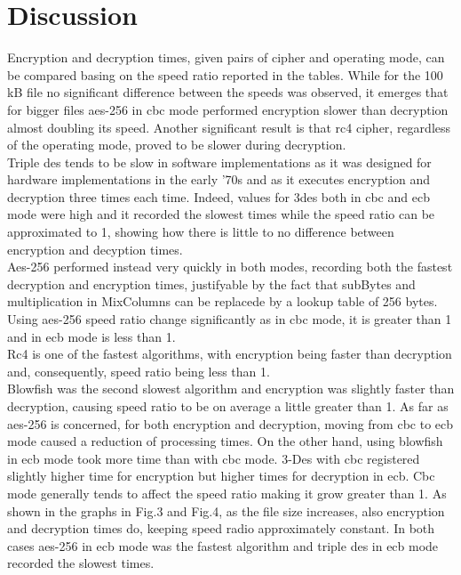 \documentclass{article}
\begin{document}
\section{Discussion}
Encryption and decryption times, given pairs of cipher and operating mode, can be compared basing on the speed ratio reported in the tables. While for the 100 kB file no significant difference between the speeds was observed, it emerges that for bigger files aes-256 in cbc mode performed encryption slower than decryption almost doubling its speed. Another significant result is that rc4 cipher, regardless of the operating mode, proved to be slower during decryption. \\
Triple des tends to be slow in software implementations as it was designed for hardware implementations in the early '70s and as it executes encryption and decryption three times each time. Indeed, values for 3des both in cbc and ecb mode were high and it recorded the slowest times while the speed ratio can be approximated to 1, showing how there is little to no difference between encryption and decyption times. \\
Aes-256 performed instead very quickly in both modes, recording both the fastest decryption and encryption times, justifyable by the fact that subBytes and multiplication in MixColumns can be replacede by a lookup table of 256 bytes. Using aes-256 speed ratio change significantly as in cbc mode, it is greater than 1 and in ecb mode is less than 1.\\
Rc4 is one of the fastest algorithms, with encryption being faster than decryption and, consequently, speed ratio being less than 1. \\
Blowfish was the second slowest algorithm and encryption was slightly faster than decryption, causing speed ratio to be on average a little greater than 1.
As far as aes-256 is concerned, for both encryption and decryption, moving from cbc to ecb mode caused a reduction of processing times. On the other hand, using blowfish in ecb mode took more time than with cbc mode.
3-Des with cbc registered slightly higher time for encryption but higher times for decryption in ecb. Cbc mode generally tends to affect the speed ratio making it grow greater than 1.
As shown in the graphs in Fig.3 and Fig.4, as the file size increases, also encryption and decryption times do, keeping speed radio approximately constant. In both cases aes-256 in ecb mode was the fastest algorithm and triple des in ecb mode recorded the slowest times. 
\end{document}
